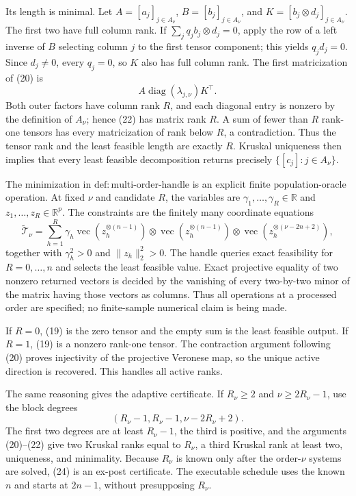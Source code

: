 Its length is minimal. Let \(A=[a_j]_{j\in A_\nu}\), \(B=[b_j]_{j\in A_\nu}\), and \(K=[b_j\otimes d_j]_{j\in A_\nu}\). The first two have full column rank. If \(\sum_j q_jb_j\otimes d_j=0\), apply the row of a left inverse of \(B\) selecting column \(j\) to the first tensor component; this yields \(q_jd_j=0\). Since \(d_j\ne0\), every \(q_j=0\), so \(K\) also has full column rank. The first matricization of (20) is
\[
 A\operatorname{diag}(\lambda_{j,\nu})K^\top. \tag{22}
\]
Both outer factors have column rank \(R\), and each diagonal entry is nonzero by the definition of \(A_\nu\); hence (22) has matrix rank \(R\). A sum of fewer than \(R\) rank-one tensors has every matricization of rank below \(R\), a contradiction. Thus the tensor rank and the least feasible length are exactly \(R\). Kruskal uniqueness then implies that every least feasible decomposition returns precisely \(\{[c_j]:j\in A_\nu\}\).

The minimization in \(\mathrm{def:multi\text{-}order\text{-}handle}\) is an explicit finite population-oracle operation. At fixed \(\nu\) and candidate \(R\), the variables are \(\gamma_1,\ldots,\gamma_R\in\mathbb R\) and \(z_1,\ldots,z_R\in\mathbb R^p\). The constraints are the finitely many coordinate equations
\[
 \widetilde{\mathcal T}_\nu
 =\sum_{h=1}^{R}\gamma_h
 \operatorname{vec}(z_h^{\otimes(n-1)})\otimes
 \operatorname{vec}(z_h^{\otimes(n-1)})\otimes
 \operatorname{vec}(z_h^{\otimes(\nu-2n+2)}), \tag{23}
\]
together with \(\gamma_h^2>0\) and \(\lVert z_h\rVert_2^2>0\). The handle queries exact feasibility for \(R=0,\ldots,n\) and selects the least feasible value. Exact projective equality of two nonzero returned vectors is decided by the vanishing of every two-by-two minor of the matrix having those vectors as columns. Thus all operations at a processed order are specified; no finite-sample numerical claim is being made.

If \(R=0\), (19) is the zero tensor and the empty sum is the least feasible output. If \(R=1\), (19) is a nonzero rank-one tensor. The contraction argument following (20) proves injectivity of the projective Veronese map, so the unique active direction is recovered. This handles all active ranks.

The same reasoning gives the adaptive certificate. If \(R_\nu\ge2\) and \(\nu\ge2R_\nu-1\), use the block degrees
\[
 (R_\nu-1,R_\nu-1,\nu-2R_\nu+2). \tag{24}
\]
The first two degrees are at least \(R_\nu-1\), the third is positive, and the arguments (20)--(22) give two Kruskal ranks equal to \(R_\nu\), a third Kruskal rank at least two, uniqueness, and minimality. Because \(R_\nu\) is known only after the order-\(\nu\) systems are solved, (24) is an ex-post certificate. The executable schedule uses the known \(n\) and starts at \(2n-1\), without presupposing \(R_\nu\).

